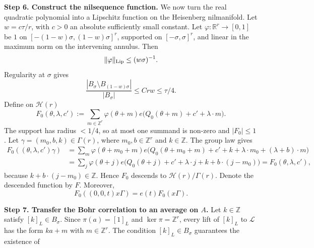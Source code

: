 \documentclass[twoside]{aomart}
\makeatletter
\theoremstyle{paperplain}
\theoremstyle{paperdefinition}
\renewenvironment{proof}[1][\proofname]{\par\pushQED{\qed}%
  \normalfont\topsep6\p@\@plus3\p@\relax\trivlist
  \item[\hskip\labelsep\itshape #1\@addpunct{.}]\ignorespaces
}{\popQED\endtrivlist\@endpefalse}
\numberwithin{equation}{section}
\makeatother
\begin{document}
\begin{proof}
\par
\medskip
\noindent\textbf{Step 6. Construct the nilsequence function.}
We now turn the real quadratic polynomial into a Lipschitz function on the Heisenberg nilmanifold.
Let $w=c\tau/r$, with $c>0$ an absolute sufficiently small constant.  Let
$\varphi:\mathbb R^r\to[0,1]$ be $1$ on
$[-(1-w)\sigma,(1-w)\sigma]^r$, supported on $[-\sigma,\sigma]^r$, and
linear in the maximum norm on the intervening annulus.  Then
\begin{equation*}
 \|\varphi\|_{\rm Lip}\le (w\sigma)^{-1}.                         
\end{equation*}
Regularity at $\sigma$ gives
\begin{equation}
 \frac{|B_\sigma\setminus B_{(1-w)\sigma}|}{|B_\sigma|}\le C r w\le\tau/4. 
                                                                            \label{inv:eq:lem73-cutoff-boundary}
\end{equation}
Define on $\mathcal H(r)$
\begin{equation}
 F_0(\theta,\lambda,c')
 :=\sum_{m\in\mathbb Z^r}\varphi(\theta+m)
 e\big(Q_0(\theta+m)+c'+\lambda\cdot m\big).                     \label{inv:eq:lem73-periodization}
\end{equation}
The support has radius $<1/4$, so at most one summand is non-zero and
$|F_0|\le1$. Let $\gamma=(m_0,b,k)\in\Gamma(r)$, where
$m_0,b\in\mathbb Z^r$ and $k\in\mathbb Z$. The group law gives
\[
\begin{aligned}
 F_0((\theta,\lambda,c')\gamma)
 &=\sum_m \varphi(\theta+m_0+m)
 e\bigl(Q_0(\theta+m_0+m)+c'+k+\lambda\cdot m_0
                 +(\lambda+b)\cdot m\bigr)\\
 &=\sum_j \varphi(\theta+j)
 e\bigl(Q_0(\theta+j)+c'+\lambda\cdot j
                 +k+b\cdot(j-m_0)\bigr)
 =F_0(\theta,\lambda,c'),
\end{aligned}
\]
because $k+b\cdot(j-m_0)\in\mathbb Z$. Hence $F_0$ descends to
$\mathcal H(r)/\Gamma(r)$.  Denote the descended function by $F$.
Moreover,
\begin{equation*}
 F_0((0,0,t)x\Gamma)=e(t)F_0(x\Gamma).                            
\end{equation*}
\par
\medskip
\noindent\textbf{Step 7. Transfer the Bohr correlation to an average on $A$.}
Let $k\in\mathbb Z$ satisfy $[k]_L\in B_\sigma$.
Since $\pi(a)=[1]_L$ and $\ker\pi=\mathbb Z^r$, every lift of
$[k]_L$ to $\mathcal L$ has the form $ka+m$ with $m\in\mathbb Z^r$.
The condition $[k]_L\in B_\sigma$ guarantees the existence of

\end{proof}
\end{document}
